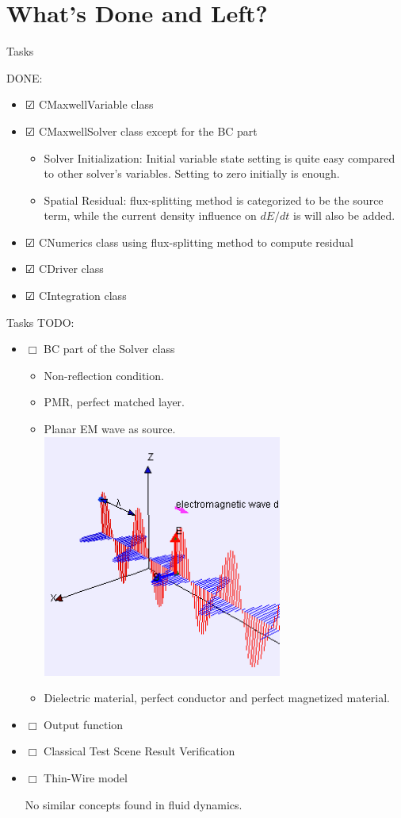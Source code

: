 \section{What's Done and Left?}

\begin{frame}{Tasks}

DONE:
\begin{itemize}
    \item $\CheckedBox$  CMaxwellVariable class
    \item $\CheckedBox$  CMaxwellSolver class except for the BC part
    
    \begin{itemize}
        \item Solver Initialization: Initial variable state setting is quite easy compared to other solver's variables. Setting to zero initially is enough.
        
        \item Spatial Residual: flux-splitting method is categorized to be the source term, while the current density influence on $dE/dt$ is will also be added.
    \end{itemize}
    
    \item $\CheckedBox$  CNumerics class using flux-splitting method to compute residual
    \item $\CheckedBox$  CDriver class
    \item $\CheckedBox$  CIntegration class
\end{itemize}

\end{frame}

\begin{frame}{Tasks}
TODO:
\begin{itemize}
    \item $\Box$  BC part of the Solver class
    \begin{itemize}
        \item Non-reflection condition.
        \item PMR, perfect matched layer.
        \item Planar EM wave as source.
        \includegraphics[width=0.2\linewidth]{figures/PlanarWave.png}
        \item Dielectric material, perfect conductor and perfect magnetized material.
    \end{itemize}
    \item $\Box$ Output function 
    \item $\Box$ Classical Test Scene Result Verification
    \item $\Box$ Thin-Wire model
    
    No similar concepts found in fluid dynamics.
\end{itemize}


\end{frame}



